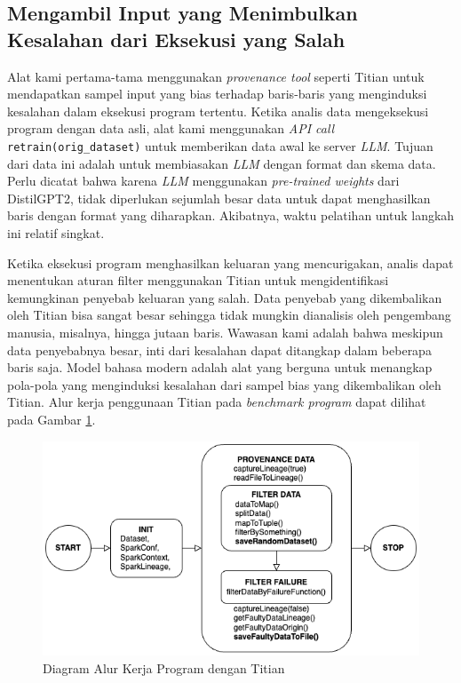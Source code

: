 \subsection{Mengambil Input yang Menimbulkan Kesalahan dari Eksekusi yang Salah}
\label{sec:mengambil input}

Alat kami pertama-tama menggunakan \emph{provenance tool} 
seperti Titian untuk mendapatkan sampel input yang bias 
terhadap baris-baris yang menginduksi kesalahan dalam eksekusi 
program tertentu. Ketika analis data mengeksekusi program 
dengan data asli, alat kami menggunakan \emph{API call} 
{\tt retrain(orig\_dataset)} untuk memberikan data 
awal ke server \emph{LLM}. Tujuan dari data ini adalah untuk 
membiasakan \emph{LLM} dengan format dan skema data. 
Perlu dicatat bahwa karena \emph{LLM} menggunakan 
\emph{pre-trained weights} dari DistilGPT2, tidak diperlukan 
sejumlah besar data untuk dapat menghasilkan baris dengan 
format yang diharapkan. Akibatnya, waktu pelatihan untuk 
langkah ini relatif singkat.

Ketika eksekusi program menghasilkan keluaran yang 
mencurigakan, analis dapat menentukan aturan filter 
menggunakan Titian untuk mengidentifikasi 
kemungkinan penyebab keluaran yang salah. Data penyebab 
yang dikembalikan oleh Titian bisa sangat besar sehingga 
tidak mungkin dianalisis oleh pengembang manusia, misalnya, 
hingga jutaan baris. Wawasan kami adalah bahwa meskipun data 
penyebabnya besar, inti dari kesalahan dapat ditangkap dalam 
beberapa baris saja. Model bahasa modern adalah alat yang 
berguna untuk menangkap pola-pola yang menginduksi kesalahan 
dari sampel bias yang dikembalikan oleh Titian. 
Alur kerja penggunaan Titian pada \emph{benchmark program}
dapat dilihat pada Gambar \ref{fig:diagramofprogramwithtitian}.

\begin{figure}[H]
  \centering
  \includegraphics[scale=0.75]{gambar/DiagramOfProgramWithTitian.png}

  \caption{Diagram Alur Kerja Program dengan Titian}
  \label{fig:diagramofprogramwithtitian}
\end{figure}

